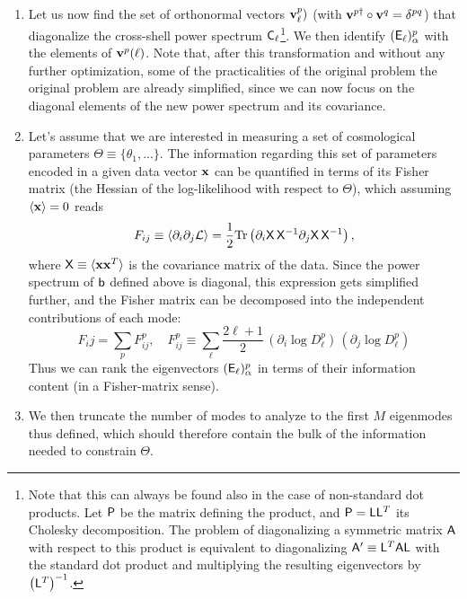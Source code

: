 \documentclass[a4paper,10pt]{article}
\begin{document}
\begin{enumerate}
    \item Let us now find the set of orthonormal vectors ${\bf v}^p_\ell)$ (with ${\bf v}^{p\dag}\circ{\bf v}^q=\delta^{pq}$) that diagonalize the cross-shell power spectrum ${\sf C}_\ell$\footnote{Note that this can always be found also in the case of non-standard dot products. Let ${\sf P}$ be the matrix defining the product, and ${\sf P}={\sf L}{\sf L}^T$ its Cholesky decomposition. The problem of diagonalizing a symmetric matrix ${\sf A}$ with respect to this product is equivalent to diagonalizing ${\sf A}'\equiv{\sf L}^T{\sf A}{\sf L}$ with the standard dot product and multiplying the resulting eigenvectors by $\left({\sf L}^T\right)^{-1}$.}. We then identify $({\sf E}_\ell)^p_\alpha$ with the elements of ${\bf v}^p(\ell)$. Note that, after this transformation and without any further optimization, some of the practicalities of the original problem the original problem are already simplified, since we can now focus on the diagonal elements of the new power spectrum and its covariance.
    \item Let's assume that we are interested in measuring a set of cosmological parameters $\Theta\equiv\{\theta_1,...\}$. The information regarding this set of parameters encoded in a given data vector ${\bf x}$ can be quantified in terms of its Fisher matrix (the Hessian of the log-likelihood with respect to $\Theta$), which assuming $\langle{\bf x}\rangle=0$ reads
    \begin{equation}
      F_{ij}\equiv\left\langle\partial_i\partial_j{\cal L}\right\rangle=\frac{1}{2}{\rm Tr}\left(\partial_i{\sf X}\,{\sf X}^{-1}\partial_j{\sf X}\,{\sf X}^{-1}\right),
    \end{equation}
    where ${\sf X}\equiv\langle {\bf x}{\bf x}^T\rangle$ is the covariance matrix of the data. Since the power spectrum of ${\sf b}$ defined above is diagonal, this expression gets simplified further, and the Fisher matrix can be decomposed into the independent contributions of each mode:
    \begin{equation}
      F_ij=\sum_p F^p_{ij},\hspace{12pt}
      F^p_{ij}\equiv\sum_\ell\frac{2\ell+1}{2}\,(\partial_i\log D^p_\ell)\,(\partial_j\log D^p_\ell)
    \end{equation}
    Thus we can rank the eigenvectors $({\sf E}_\ell)^p_\alpha$ in terms of their information content (in a Fisher-matrix sense).
    \item We then truncate the number of modes to analyze to the first $M$ eigenmodes thus defined, which should therefore contain the bulk of the information needed to constrain $\Theta$.
  \end{enumerate}
\end{document}
